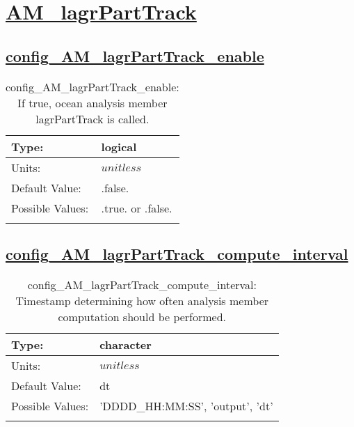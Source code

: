 \section[AM\_lagrPartTrack]{\hyperref[sec:nm_tab_AM_lagrPartTrack]{AM\_lagrPartTrack}}
\label{sec:nm_sec_AM_lagrPartTrack}
\subsection[config\_AM\_lagrPartTrack\_enable]{\hyperref[sec:nm_tab_AM_lagrPartTrack]{config\_AM\_lagrPartTrack\_enable}}
\label{subsec:nm_sec_config_AM_lagrPartTrack_enable}
\begin{center}
\begin{longtable}{| p{2.0in} || p{4.0in} |}
    \hline
    Type: & logical \\
    \hline
    Units: & $unitless$ \\
    \hline
    Default Value: & .false. \\
    \hline
    Possible Values: & .true. or .false. \\
    \hline
    \caption{config\_AM\_lagrPartTrack\_enable: If true, ocean analysis member lagrPartTrack is called.}
\end{longtable}
\end{center}
\subsection[config\_AM\_lagrPartTrack\_compute\_interval]{\hyperref[sec:nm_tab_AM_lagrPartTrack]{config\_AM\_lagrPartTrack\_compute\_interval}}
\label{subsec:nm_sec_config_AM_lagrPartTrack_compute_interval}
\begin{center}
\begin{longtable}{| p{2.0in} || p{4.0in} |}
    \hline
    Type: & character \\
    \hline
    Units: & $unitless$ \\
    \hline
    Default Value: & dt \\
    \hline
    Possible Values: & 'DDDD\_HH:MM:SS', 'output', 'dt' \\
    \hline
    \caption{config\_AM\_lagrPartTrack\_compute\_interval: Timestamp determining how often analysis member computation should be performed.}
\end{longtable}
\end{center}
